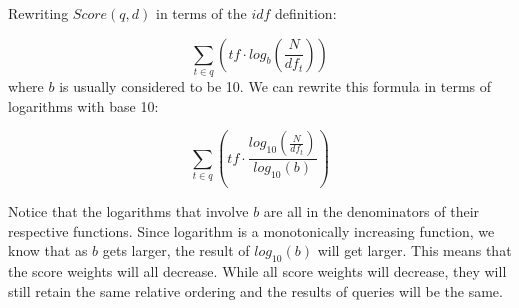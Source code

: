 \documentclass{article}%
\begin{document}
Rewriting $Score(q, d)$ in terms of the $idf$ definition:

$$
\sum_{t \in q}\left(tf \cdot log_{b}\left(\frac{N}{df_t}\right)\right)
$$
\noindent where $b$ is usually considered to be 10. We can rewrite this formula in terms of logarithms with base 10:

$$
\sum_{t \in q}
\left(
tf
\cdot
\frac{log_{10}\left(\frac{N}{df_t}\right)}{log_{10}(b)}
\right)
$$

\noindent Notice that the logarithms that involve $b$ are all in the denominators of their respective functions. Since logarithm is a monotonically increasing function, we know that as $b$ gets larger, the result of $log_{10}(b)$ will get larger. This means that the score weights will all decrease. While all score weights will decrease, they will still retain the same relative ordering and the results of queries will be the same.
\end{document}

